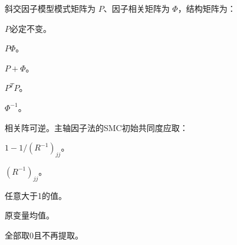 \par\addvspace{6pt}\noindent\begin{minipage}{\linewidth}


斜交因子模型模式矩阵为 \(P\)、因子相关矩阵为 \(\Phi\)，结构矩阵为：


\begin{choices}

\item \(P\)必定不变。

\item \(P\Phi\)。

\item \(P+\Phi\)。

\item \(P^TP\)。

\item \(\Phi^{-1}\)。

\end{choices}

\end{minipage}\par\vspace{4pt}

\par\addvspace{6pt}\noindent\begin{minipage}{\linewidth}


相关阵可逆。主轴因子法的SMC初始共同度应取：


\begin{choices}

\item \(1-1/(R^{-1})_{jj}\)。

\item \((R^{-1})_{jj}\)。

\item 任意大于1的值。

\item 原变量均值。

\item 全部取0且不再提取。

\end{choices}

\end{minipage}\par\vspace{4pt}

